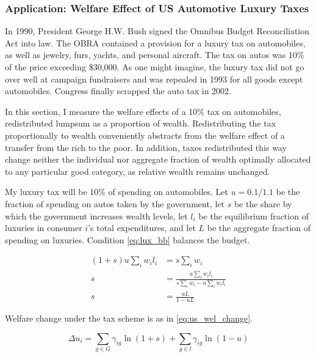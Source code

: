 \subsubsection{Application: Welfare Effect of US Automotive Luxury Taxes}

In 1990, President George H.W. Bush signed the Omnibus Budget Reconciliation Act into law.\footnotemark{}  The OBRA contained a provision for a luxury tax on automobiles, as well as jewelry, furs, yachts, and personal aircraft.  The tax on autos was 10\% of the price exceeding \$30,000.  As one might imagine, the luxury tax did not go over well at campaign fundraisers and was repealed in 1993 for all goods except automobiles.\footnotemark{}  Congress finally scrapped the auto tax in 2002.

In this section, I measure the welfare effects of a 10\% tax on automobiles, redistributed lumpsum as a proportion of wealth.  Redistributing the tax proportionally to wealth conveniently abstracts from the welfare effect of a transfer from the rich to the poor.  In addition, taxes redistributed this way change neither the individual nor aggregate fraction of wealth optimally allocated to any particular good category, as relative wealth remains unchanged.

My luxury tax will be 10\% of spending on automobiles.  Let $u = 0.1 / 1.1$ be the fraction of spending on autos taken by the government, let $s$ be the share by which the government increases wealth levels, let $l_i$ be the equilibrium fraction of luxuries in consumer $i$'s total expenditures, and let $L$ be the aggregate fraction of spending on luxuries.  Condition \eqref{eq:lux_bb} balances the budget.

\begin{align}
    (1 + s) u \sum_i w_i l_i &= s \sum_i w_i \nonumber \\
    s &= \frac{u \sum_i w_i l_i}{s \sum_i w_i - u \sum_i w_i l_i} \nonumber \\
    \label{eq:lux_bb}
    s &= \frac{u L}{1 - uL}
\end{align}

Welfare change under the tax scheme is as in \eqref{eq:us_wel_change}.

\begin{equation}
    \label{eq:us_wel_change}
    \Delta u_i = \sum_{g\in G} \gamma_{ig} \ln(1 + s) + \sum_{g\in l} \gamma_{ig} \ln (1 - u)
\end{equation}

